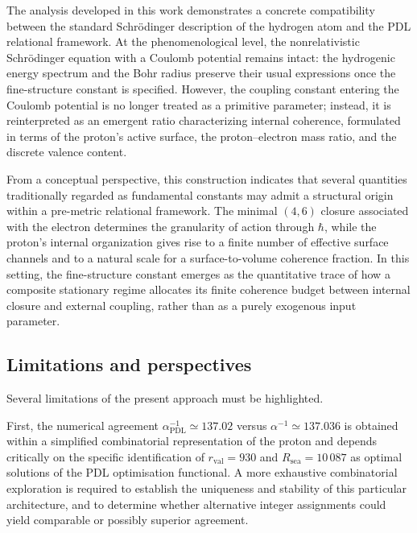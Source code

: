 \documentclass[12pt,a4paper]{article}
\begin{document}
The analysis developed in this work demonstrates a concrete compatibility between the standard Schr\"odinger description of the hydrogen atom and the PDL relational framework. At the phenomenological level, the nonrelativistic Schr\"odinger equation with a Coulomb potential remains intact: the hydrogenic energy spectrum and the Bohr radius preserve their usual expressions once the fine-structure constant is specified. However, the coupling constant entering the Coulomb potential is no longer treated as a primitive parameter; instead, it is reinterpreted as an emergent ratio characterizing internal coherence, formulated in terms of the proton’s active surface, the proton–electron mass ratio, and the discrete valence content.\cite{Laubscher2026PDL_English,Laubscher2026LDP_French}

From a conceptual perspective, this construction indicates that several quantities traditionally regarded as fundamental constants may admit a structural origin within a pre-metric relational framework. The minimal \((4,6)\) closure associated with the electron determines the granularity of action through \(\hbar\), while the proton’s internal organization gives rise to a finite number of effective surface channels and to a natural scale for a surface-to-volume coherence fraction. In this setting, the fine-structure constant emerges as the quantitative trace of how a composite stationary regime allocates its finite coherence budget between internal closure and external coupling, rather than as a purely exogenous input parameter.\cite{Laubscher2026IntroPDL,Laubscher2026PDL_English}

\subsection{Limitations and perspectives}

Several limitations of the present approach must be highlighted.

First, the numerical agreement \(\alpha_{\text{PDL}}^{-1}\simeq 137.02\) versus \(\alpha^{-1}\simeq 137.036\) is obtained within a simplified combinatorial representation of the proton and depends critically on the specific identification of \(r_{\text{val}}=930\) and \(R_{\text{sea}}=10\,087\) as optimal solutions of the PDL optimisation functional. A more exhaustive combinatorial exploration is required to establish the uniqueness and stability of this particular architecture, and to determine whether alternative integer assignments could yield comparable or possibly superior agreement.\cite{Laubscher2026PDL_English,Laubscher2026LDP_French}
\end{document}
